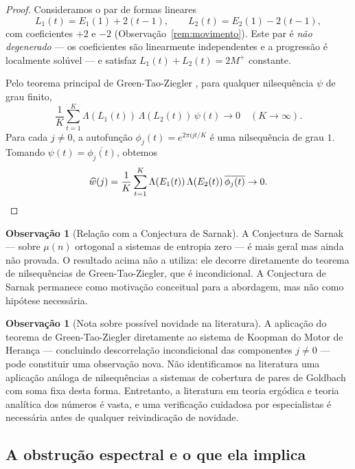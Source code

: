 \documentclass[12pt,a4paper]{article}
\theoremstyle{definition}
\newtheorem{remark}[theorem]{Observação}
\begin{document}
	\begin{proof}
		Consideramos o par de formas lineares
		\[
		L_1(t) = E_1(1) + 2(t-1),\qquad
		L_2(t) = E_2(1) - 2(t-1),
		\]
		com coeficientes $+2$ e $-2$ (Observação~\ref{rem:movimento}).
		Este par é \emph{não degenerado} — os coeficientes são
		linearmente independentes e a progressão é localmente solúvel
		— e satisfaz $L_1(t) + L_2(t) = 2M^+$ constante.
		
		Pelo teorema principal de Green-Tao-Ziegler
		\cite{greentaoziegler}, para qualquer nilsequência $\psi$ de
		grau finito,
		\[
		\frac{1}{K}\sum_{t=1}^{K} \Lambda(L_1(t))\,\Lambda(L_2(t))\,
		\psi(t) \to 0 \quad (K \to \infty).
		\]
		Para cada $j \neq 0$, a autofunção $\phi_j(t) = e^{2\pi i j t/K}$
		é uma nilsequência de grau $1$. Tomando
		$\psi(t) = \overline{\phi_j(t)}$, obtemos
		\[
		\widehat{w}(j) = \frac{1}{K}\sum_{t=1}^{K}
		\Lambda(E_1(t))\,\Lambda(E_2(t))\,\overline{\phi_j(t)}
		\to 0. \qedhere
		\]
	\end{proof}
	
	\begin{remark}[Relação com a Conjectura de Sarnak]
		\label{rem:sarnak}
		A Conjectura de Sarnak \cite{sarnak} — sobre $\mu(n)$ ortogonal
		a sistemas de entropia zero — é mais geral mas ainda não provada.
		O resultado acima não a utiliza: ele decorre diretamente do
		teorema de nilsequências de Green-Tao-Ziegler, que é
		incondicional. A Conjectura de Sarnak permanece como motivação
		conceitual para a abordagem, mas não como hipótese necessária.
	\end{remark}
	
	\begin{remark}[Nota sobre possível novidade na literatura]
		\label{rem:novidade}
		A aplicação do teorema de Green-Tao-Ziegler diretamente ao
		sistema de Koopman do Motor de Herança — concluindo descorrelação
		incondicional das componentes $j \neq 0$ — pode constituir uma
		observação nova. Não identificamos na literatura uma aplicação
		análoga de nilsequências a sistemas de cobertura de pares de
		Goldbach com soma fixa desta forma. Entretanto, a literatura em
		teoria ergódica e teoria analítica dos números é vasta, e uma
		verificação cuidadosa por especialistas é necessária antes de
		qualquer reivindicação de novidade.
	\end{remark}
	
	\subsection{A obstrução espectral e o que ela implica}
	
\end{document}
